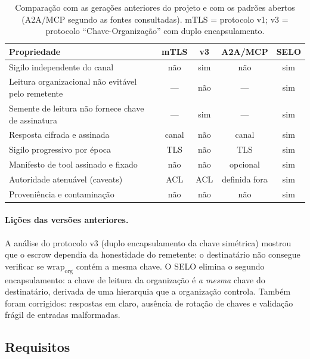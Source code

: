 \documentclass[11pt,a4paper]{article}
\theoremstyle{plain}
\theoremstyle{definition}
\theoremstyle{remark}
\begin{document}
\begin{table}[h!]
\centering\small
\begin{tabular}{p{4.5cm}cccc}
\toprule
\rowcolor{corCaixa}\textbf{Propriedade} & \textbf{mTLS} & \textbf{v3} & \textbf{A2A/MCP} & \textbf{SELO} \\
\midrule
Sigilo independente do canal & não & sim & não & sim \\
Leitura organizacional não evitável pelo remetente & --- & não & --- & sim \\
Semente de leitura não fornece chave de assinatura & --- & sim & --- & sim \\
Resposta cifrada e assinada & canal & não & canal & sim \\
Sigilo progressivo por época & TLS & não & TLS & sim \\
Manifesto de tool assinado e fixado & não & não & opcional & sim \\
Autoridade atenuável (caveats) & ACL & ACL & definida fora & sim \\
Proveniência e contaminação & não & não & não & sim \\
\bottomrule
\end{tabular}
\caption{Comparação com as gerações anteriores do projeto e com os padrões abertos (A2A/MCP segundo as fontes consultadas). mTLS = protocolo v1; v3 = protocolo ``Chave-Organização'' com duplo encapsulamento.}
\end{table}

\paragraph{Lições das versões anteriores.} A análise do protocolo v3 (duplo encapsulamento da chave simétrica) mostrou que o escrow dependia da honestidade do remetente: o destinatário não consegue verificar se $\mathrm{wrap}_{\mathrm{org}}$ contém a mesma chave. O SELO elimina o segundo encapsulamento: a chave de leitura da organização é \emph{a mesma} chave do destinatário, derivada de uma hierarquia que a organização controla. Também foram corrigidos: respostas em claro, ausência de rotação de chaves e validação frágil de entradas malformadas.

\subsection{Requisitos}
\end{document}
